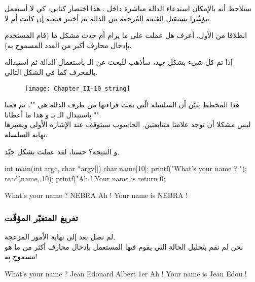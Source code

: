 ستلاحظ أنه بالإمكان استدعاء الدالة
مباشرة داخل
.
هذا اختصار كتابي، كي لا أستعمل مؤشّرا يستقبل القيمة المُرجعة من الدالة ثم أختبر قيمته إن كانت
أم لا.

انطلاقا من
الأول، أعرف هل
عملت على ما يرام أم حدث مشكل ما (قام المستخدم بإدخال محارف أكبر من العدد المسموح به).

إذا تم كل شيء بشكل جيد، سأذهب للبحث عن الـ
باستعمال الدالة
ثم استبداله بالمحرف
كما في الشكل التالي.

\begin{figure}[H]
	\centering
	\texttt{[image: Chapter\_II-10\_string]}
\end{figure}

هذا المخطط يبيّن أن السلسلة الّتي تمت قراءتها من طرف الدالة
هي
""،
ثم قمنا باستبدال الـ
بـ
و هذا ما أعطانا
"".\\
ليس مشكلا أن توجد علامتا
متتابعتين. الحاسوب سيتوقف عند الإشارة الأولى ويعتبرها نهاية السلسلة.

و النتيجة؟ حسنا، لقد عملت بشكل جيّد.

\begin{Csource}
  int main(int argc, char *argv[])
  {
  	char name[10];
  	printf("What's your name ? ");
  	read(name, 10);
  	printf("Ah ! Your name is %
  	return 0;
  }
\end{Csource}

\begin{Console}
What's your name ? NEBRA
Ah ! Your name is NEBRA !
\end{Console}

\subsubsection{تفريغ المتغيّر المؤقّت}

لم نصل بعد إلى نهاية الأمور المزعجة.\\
نحن لم نقم بتحليل الحالة التي يقوم فيها المستعمل بإدخال محارف أكثر من ما هو مسموح به!

\begin{Console}
What's your name ? Jean Edouard Albert 1er
Ah ! Your name is Jean Edou !
\end{Console}

